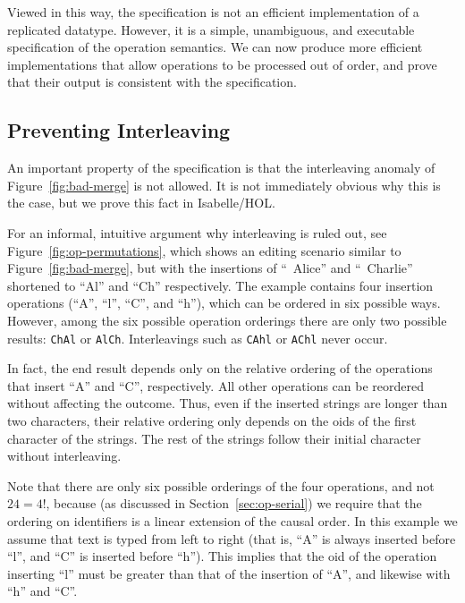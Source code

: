 Viewed in this way, the specification is not an efficient implementation of a replicated datatype.
However, it is a simple, unambiguous, and executable specification of the operation semantics.
We can now produce more efficient implementations that allow operations to be processed out of order, and prove that their output is consistent with the specification.

\subsection{Preventing Interleaving}

An important property of the specification is that the interleaving anomaly of Figure~\ref{fig:bad-merge} is not allowed.
It is not immediately obvious why this is the case, but we prove this fact in Isabelle/HOL.

For an informal, intuitive argument why interleaving is ruled out, see Figure~\ref{fig:op-permutations}, which shows an editing scenario similar to Figure~\ref{fig:bad-merge}, but with the insertions of ``~Alice'' and ``~Charlie'' shortened to ``Al'' and ``Ch'' respectively.
The example contains four insertion operations (``A'', ``l'', ``C'', and ``h''), which can be ordered in six possible ways.
However, among the six possible operation orderings there are only two possible results: \texttt{ChAl} or \texttt{AlCh}.
Interleavings such as \texttt{CAhl} or \texttt{AChl} never occur.

In fact, the end result depends only on the relative ordering of the operations that insert ``A'' and ``C'', respectively.
All other operations can be reordered without affecting the outcome.
Thus, even if the inserted strings are longer than two characters, their relative ordering only depends on the oids of the first character of the strings.
The rest of the strings follow their initial character without interleaving.

Note that there are only six possible orderings of the four operations, and not $24 = 4!$, because (as discussed in Section~\ref{sec:op-serial}) we require that the ordering on identifiers is a linear extension of the causal order.
In this example we assume that text is typed from left to right (that is, ``A'' is always inserted before ``l'', and ``C'' is inserted before ``h'').
This implies that the oid of the operation inserting ``l'' must be greater than that of the insertion of ``A'', and likewise with ``h'' and ``C''.

